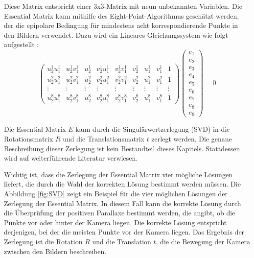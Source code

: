 Diese Matrix entspricht einer 3x3-Matrix mit neun unbekannten Variablen. Die Essential Matrix kann mithilfe des Eight-Point-Algorithmus geschätzt werden, der die epipolare Bedingung für mindestens acht korrespondierende Punkte in den Bildern verwendet. Dazu wird ein Lineares Gleichungssystem wie folgt aufgestellt \cite{gao2021vSLAM, stachniss2020FandEmatrix}: 
\begin{equation}
    \begin{pmatrix}
        u_2^1 u_1^1 & u_2^1 v_1^1 & u_2^1 & v_2^1 u_1^1 & v_2^1 v_1^1 & v_2^1 & u_1^1 & v_1^1 & 1 \\
        u_2^2 u_1^2 & u_2^2 v_1^2 & u_2^2 & v_2^2 u_1^2 & v_2^2 v_1^2 & v_2^2 & u_1^2 & v_1^2 & 1 \\
        \vdots & \vdots & \vdots & \vdots & \vdots & \vdots & \vdots & \vdots & \vdots \\
        u_2^8 u_1^8 & u_2^8 v_1^8 & u_2^8 & v_2^8 u_1^8 & v_2^8 v_1^8 & v_2^8 & u_1^8 & v_1^8 & 1 
    \end{pmatrix}
    \begin{pmatrix}
        e_1 \\ e_2 \\ e_3 \\ e_4 \\ e_5 \\ e_6 \\ e_7 \\ e_8 \\ e_9
    \end{pmatrix}
    = 0
\end{equation}

Die Essential Matrix \( E \) kann durch die Singulärwertzerlegung (SVD) in die Rotationsmatrix \( R \) und die Translationsmatrix \( t \) zerlegt werden. Die genaue Beschreibung dieser Zerlegung ist kein Bestandteil dieses Kapitels. Stattdessen wird auf weiterführende Literatur verwiesen. \cite{gao2021vSLAM, tsai1984svd}

Wichtig ist, dass die Zerlegung der Essential Matrix vier mögliche Lösungen liefert, die durch die Wahl der korrekten Lösung bestimmt werden müssen. Die Abbildung \ref{fig:SVD} zeigt ein Beispiel für die vier möglichen Lösungen der Zerlegung der Essential Matrix. In diesem Fall kann die korrekte Lösung durch die Überprüfung der positiven Parallaxe bestimmt werden, die angibt, ob die Punkte vor oder hinter der Kamera liegen. Die korrekte Lösung entspricht derjenigen, bei der die meisten Punkte vor der Kamera liegen. Das Ergebnis der Zerlegung ist die Rotation \( R \) und die Translation \( t \), die die Bewegung der Kamera zwischen den Bildern beschreiben. \cite{gao2021vSLAM}

